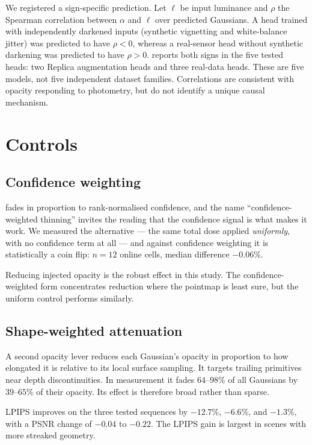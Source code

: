 We registered a sign-specific prediction. Let $\ell$ be input
luminance and $\rho$ the Spearman correlation between $\alpha$ and $\ell$ over
predicted Gaussians. A head trained with independently darkened inputs
(synthetic vignetting and white-balance jitter) was predicted to have
$\rho<0$, whereas a real-sensor head without synthetic darkening was
predicted to have $\rho>0$.  reports both signs in the
five tested heads: two Replica augmentation heads and three real-data
heads. These are five models, not five independent dataset families.
Correlations are consistent with opacity responding to photometry, but do
not identify a unique causal mechanism.

\section{Controls}
\label{sec:thin:ablations}

\subsection{Confidence weighting}

 fades in proportion to rank-normalised confidence, and the name
``confidence-weighted thinning'' invites the reading that the confidence signal
is what makes it work. We measured the alternative --- the same total dose
applied \emph{uniformly}, with no confidence term at all --- and against
confidence weighting it is statistically a coin flip: $n{=}12$ online cells,
median difference $-0.06\%$.

Reducing injected opacity is the robust effect in this study. The
confidence-weighted form concentrates reduction where the pointmap is least
sure, but the uniform control performs similarly.

\subsection{Shape-weighted attenuation}

A second opacity lever reduces each Gaussian's opacity in proportion to how
elongated it is relative to its local surface sampling. It targets trailing
primitives near depth discontinuities. In measurement it fades $64$--$98\%$
of all Gaussians by $39$--$65\%$ of their opacity. Its effect is therefore
broad rather than sparse.

LPIPS improves on the three tested sequences by $-12.7\%$, $-6.6\%$, and
$-1.3\%$, with a PSNR change of $-0.04$ to $-0.22$\dB{}.
The LPIPS gain is largest in scenes with more streaked geometry.
